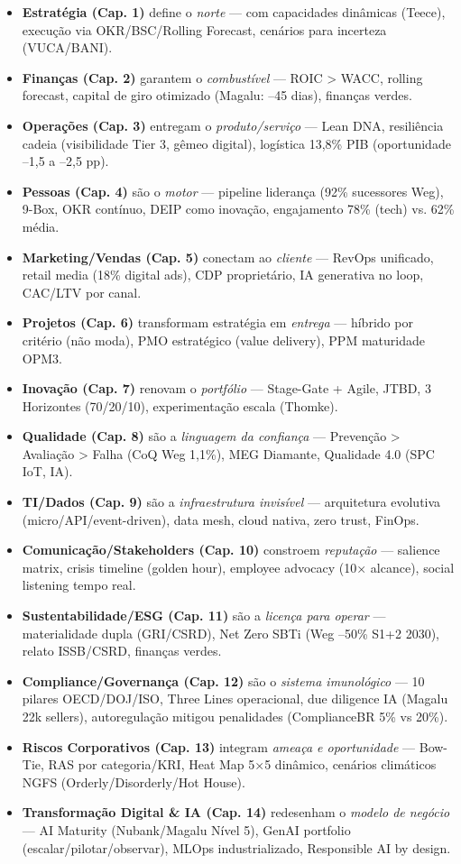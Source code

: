\begin{itemize}
    \item \textbf{Estratégia (Cap. 1)} define o \textit{norte} — com capacidades dinâmicas (Teece), execução via OKR/BSC/Rolling Forecast, cenários para incerteza (VUCA/BANI).
    \item \textbf{Finanças (Cap. 2)} garantem o \textit{combustível} — ROIC > WACC, rolling forecast, capital de giro otimizado (Magalu: –45 dias), finanças verdes.
    \item \textbf{Operações (Cap. 3)} entregam o \textit{produto/serviço} — Lean DNA, resiliência cadeia (visibilidade Tier 3, gêmeo digital), logística 13,8\% PIB (oportunidade –1,5 a –2,5 pp).
    \item \textbf{Pessoas (Cap. 4)} são o \textit{motor} — pipeline liderança (92\% sucessores Weg), 9-Box, OKR contínuo, DEIP como inovação, engajamento 78\% (tech) vs. 62\% média.
    \item \textbf{Marketing/Vendas (Cap. 5)} conectam ao \textit{cliente} — RevOps unificado, retail media (18\% digital ads), CDP proprietário, IA generativa no loop, CAC/LTV por canal.
    \item \textbf{Projetos (Cap. 6)} transformam estratégia em \textit{entrega} — híbrido por critério (não moda), PMO estratégico (value delivery), PPM maturidade OPM3.
    \item \textbf{Inovação (Cap. 7)} renovam o \textit{portfólio} — Stage-Gate + Agile, JTBD, 3 Horizontes (70/20/10), experimentação escala (Thomke).
    \item \textbf{Qualidade (Cap. 8)} são a \textit{linguagem da confiança} — Prevenção > Avaliação > Falha (CoQ Weg 1,1\%), MEG Diamante, Qualidade 4.0 (SPC IoT, IA).
    \item \textbf{TI/Dados (Cap. 9)} são a \textit{infraestrutura invisível} — arquitetura evolutiva (micro/API/event-driven), data mesh, cloud nativa, zero trust, FinOps.
    \item \textbf{Comunicação/Stakeholders (Cap. 10)} constroem \textit{reputação} — salience matrix, crisis timeline (golden hour), employee advocacy (10× alcance), social listening tempo real.
    \item \textbf{Sustentabilidade/ESG (Cap. 11)} são a \textit{licença para operar} — materialidade dupla (GRI/CSRD), Net Zero SBTi (Weg –50\% S1+2 2030), relato ISSB/CSRD, finanças verdes.
    \item \textbf{Compliance/Governança (Cap. 12)} são o \textit{sistema imunológico} — 10 pilares OECD/DOJ/ISO, Three Lines operacional, due diligence IA (Magalu 22k sellers), autoregulação mitigou penalidades (ComplianceBR 5\% vs 20\%).
    \item \textbf{Riscos Corporativos (Cap. 13)} integram \textit{ameaça e oportunidade} — Bow-Tie, RAS por categoria/KRI, Heat Map 5×5 dinâmico, cenários climáticos NGFS (Orderly/Disorderly/Hot House).
    \item \textbf{Transformação Digital \& IA (Cap. 14)} redesenham o \textit{modelo de negócio} — AI Maturity (Nubank/Magalu Nível 5), GenAI portfolio (escalar/pilotar/observar), MLOps industrializado, Responsible AI by design.
\end{itemize}

